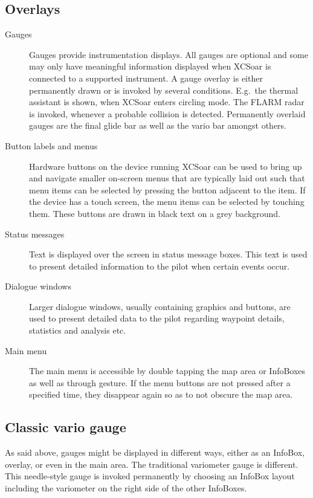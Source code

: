 \subsection*{Overlays}
\begin{description}
\item[Gauges]  Gauges provide instrumentation displays. All gauges are optional
and some may only have meaningful information displayed when XCSoar is
connected to a supported instrument.
A gauge overlay is either permanently drawn or is invoked by several 
conditions.  E.g.\ the thermal assistant is shown, when XCSoar enters circling
mode. The FLARM radar is invoked, whenever a probable collision is detected.
Permanently overlaid gauges are the final glide bar as well as the vario bar
amongst others.
\item[Button labels and menus] Hardware buttons on the device running XCSoar
can be used to bring up and navigate smaller on-screen menus that are
typically laid out such that menu items can be selected by pressing the
button adjacent to the item.  If the device has a touch screen, the menu
items can be selected by touching them.  These buttons are drawn in black
text on a grey background.
\item[Status messages] Text is displayed over the screen in status message
boxes.  This text is used to present detailed information to the pilot when
certain events occur.
\item[Dialogue windows] Larger dialogue windows, usually containing graphics and
buttons, are used to present detailed data to the pilot regarding waypoint
details, statistics and analysis etc.
\item[Main menu] The main menu is accessible by double tapping the map area or
InfoBoxes as well as through gesture. If the menu buttons are not pressed after
 a specified time, they disappear again so as to not obscure 
the map area.
\end{description}

\subsection*{Classic vario gauge}
As said above, gauges might be displayed in different ways, either as an 
InfoBox, overlay, or even in the main area. The traditional variometer gauge is
different. This needle-style gauge is invoked permanently by choosing an InfoBox
layout including the variometer on the right side of the other InfoBoxes.

